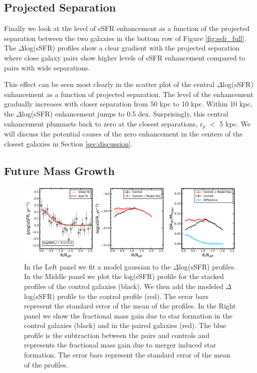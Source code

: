 \documentclass[iop,revtex4,twocolumn,apj,numberedappendix,appendixfloats]{emulateapj}
\begin{document}
\subsection{Projected Separation}
Finally we look at the level of sSFR enhancement as a function of the projected separation between the two galaxies in the bottom row of Figure \ref{fig:ssfr_full}. The $\Delta$log(sSFR) profiles show a clear gradient with the projected separation where close galaxy pairs show higher levels of sSFR enhancement compared to pairs with wide separations. 

This effect can be seen most clearly in the scatter plot of the central $\Delta$log(sSFR) enhancement as a function of projected separation. The level of the enhancement gradually increases with closer separation from 50 kpc to 10 kpc. Within 10 kpc, the $\Delta$log(sSFR) enhancement jumps to 0.5 dex. Surprisingly, this central enhancement plummets back to zero at the closest separations, r$_p$ $<$ 5 kpc. We will discuss the potential causes of the zero enhancement in the centers of the closest galaxies in Section \ref{sec:discussion}.

\subsection{Future Mass Growth}
\begin{figure}
\centering
\includegraphics[width=\linewidth]{fig/mass_gain_1.pdf}
\caption[Example of the calculation of the fractional mass gain due to merger induced star formation for a single mass bin.]{In the Left panel we fit a model gaussian to the $\Delta$log(sSFR) profiles. In the Middle panel we plot the log(sSFR) profile for the stacked profiles of the control galaxies (black). We then add the modeled $\Delta$log(sSFR) profile to the control profile (red). The error bars represent the standard error of the mean of the profiles. In the Right panel we show the fractional mass gain due to star formation in the control galaxies (black) and in the paired galaxies (red). The blue profile is the subtraction between the pairs and controls and represents the fractional mass gain due to merger induced star formation. The error bars represent the standard error of the mean of the profiles. }
\label{fig:mass_gain}
\end{figure}
\end{document}

